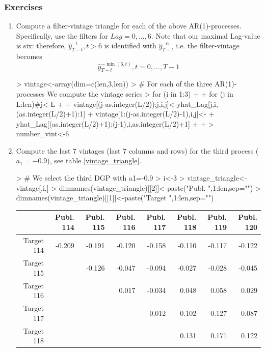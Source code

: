 \documentclass[a4paper]{book}
\begin{document}
\subsubsection{Exercises}
\begin{enumerate}
\item Compute a filter-vintage triangle for each of the above AR(1)-processes. Specifically, use the filters for $Lag=0,...,6$. Note that our maximal Lag-value is six: therefore,  $\hat{y}_{T-t}^{-t},t>6$ is identified with $\hat{y}_{T-t}^{-6}$ i.e. the filter-vintage becomes
\[\hat{y}_{T-t}^{-\min(6,t)}, t=0,...,T-1\]
\begin{Schunk}
\begin{Sinput}
> vintage<-array(dim=c(len,3,len))
> # For each of the three AR(1)-processes We compute the vintage series
> for (i in 1:3)
+ {
+   for (j in L:len)#j<-L
+   {
+     vintage[(j-as.integer(L/2)):j,i,j]<-yhat_Lag[j,i,(as.integer(L/2)+1):1]
+     vintage[1:(j-as.integer(L/2)-1),i,j]<-
+     yhat_Lag[(as.integer(L/2)+1):(j-1),i,as.integer(L/2)+1]
+   }
+ }
> number_vint<-6
\end{Sinput}
\end{Schunk}
\item Compute the last 7 vintages (last 7 columns and rows) for the third process ($a_1=-0.9$),  see table \ref{vintage_triangle}.
\begin{Schunk}
\begin{Sinput}
> # We select the third DGP with a1=-0.9
> i<-3
> vintage_triangle<-vintage[,i,]
> dimnames(vintage_triangle)[[2]]<-paste("Publ. ",1:len,sep="")
> dimnames(vintage_triangle)[[1]]<-paste("Target ",1:len,sep="")
\end{Sinput}
\end{Schunk}
\begin{table}[ht]
\centering
\begin{tabular}{rrrrrrrr}
  \hline
 & Publ. 114 & Publ. 115 & Publ. 116 & Publ. 117 & Publ. 118 & Publ. 119 & Publ. 120 \\ 
  \hline
Target 114 & -0.209 & -0.191 & -0.120 & -0.158 & -0.110 & -0.117 & -0.122 \\ 
  Target 115 &  & -0.126 & -0.047 & -0.094 & -0.027 & -0.028 & -0.045 \\ 
  Target 116 &  &  & 0.017 & -0.034 & 0.048 & 0.058 & 0.029 \\ 
  Target 117 &  &  &  & 0.012 & 0.102 & 0.127 & 0.087 \\ 
  Target 118 &  &  &  &  & 0.131 & 0.171 & 0.122 \\ 

\end{tabular}
\end{table}
\end{enumerate}
\end{document}
